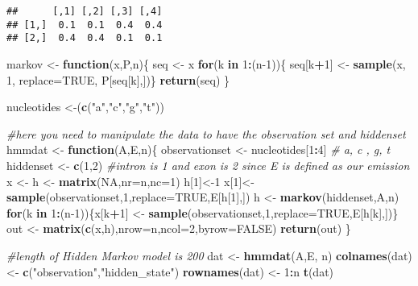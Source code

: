 \documentclass[
]{article}
\newenvironment{Shaded}{\begin{snugshade}}{\end{snugshade}}
\newcommand{\CommentTok}[1]{\textcolor[rgb]{0.56,0.35,0.01}{\textit{#1}}}
\newcommand{\ControlFlowTok}[1]{\textcolor[rgb]{0.13,0.29,0.53}{\textbf{#1}}}
\newcommand{\DataTypeTok}[1]{\textcolor[rgb]{0.13,0.29,0.53}{#1}}
\newcommand{\DecValTok}[1]{\textcolor[rgb]{0.00,0.00,0.81}{#1}}
\newcommand{\KeywordTok}[1]{\textcolor[rgb]{0.13,0.29,0.53}{\textbf{#1}}}
\newcommand{\NormalTok}[1]{#1}
\newcommand{\OperatorTok}[1]{\textcolor[rgb]{0.81,0.36,0.00}{\textbf{#1}}}
\newcommand{\OtherTok}[1]{\textcolor[rgb]{0.56,0.35,0.01}{#1}}
\newcommand{\StringTok}[1]{\textcolor[rgb]{0.31,0.60,0.02}{#1}}
\begin{document}
\begin{verbatim}
##      [,1] [,2] [,3] [,4]
## [1,]  0.1  0.1  0.4  0.4
## [2,]  0.4  0.4  0.1  0.1
\end{verbatim}

\begin{Shaded}
\begin{Highlighting}[]
\NormalTok{markov <-}\StringTok{ }\ControlFlowTok{function}\NormalTok{(x,P,n)\{ seq <-}\StringTok{ }\NormalTok{x}
\ControlFlowTok{for}\NormalTok{(k }\ControlFlowTok{in} \DecValTok{1}\OperatorTok{:}\NormalTok{(n}\DecValTok{-1}\NormalTok{))\{}
\NormalTok{ seq[k}\OperatorTok{+}\DecValTok{1}\NormalTok{] <-}\StringTok{ }\KeywordTok{sample}\NormalTok{(x, }\DecValTok{1}\NormalTok{, }\DataTypeTok{replace=}\OtherTok{TRUE}\NormalTok{, P[seq[k],])\}}
\KeywordTok{return}\NormalTok{(seq)}
\NormalTok{\}}

\NormalTok{nucleotides <-(}\KeywordTok{c}\NormalTok{(}\StringTok{"a"}\NormalTok{,}\StringTok{"c"}\NormalTok{,}\StringTok{"g"}\NormalTok{,}\StringTok{"t"}\NormalTok{))}

\CommentTok{#here you need to manipulate the data to have the observation set and hiddenset}
\NormalTok{hmmdat <-}\StringTok{ }\ControlFlowTok{function}\NormalTok{(A,E,n)\{}
\NormalTok{ observationset <-}\StringTok{ }\NormalTok{nucleotides[}\DecValTok{1}\OperatorTok{:}\DecValTok{4}\NormalTok{] }\CommentTok{# a, c , g, t}
\NormalTok{ hiddenset <-}\StringTok{ }\KeywordTok{c}\NormalTok{(}\DecValTok{1}\NormalTok{,}\DecValTok{2}\NormalTok{) }\CommentTok{#intron is 1 and exon is 2 since E is defined as our emission}
\NormalTok{ x <-}\StringTok{ }\NormalTok{h <-}\StringTok{ }\KeywordTok{matrix}\NormalTok{(}\OtherTok{NA}\NormalTok{,}\DataTypeTok{nr=}\NormalTok{n,}\DataTypeTok{nc=}\DecValTok{1}\NormalTok{)}
\NormalTok{ h[}\DecValTok{1}\NormalTok{]<-}\DecValTok{1}
\NormalTok{ x[}\DecValTok{1}\NormalTok{]<-}\KeywordTok{sample}\NormalTok{(observationset,}\DecValTok{1}\NormalTok{,}\DataTypeTok{replace=}\OtherTok{TRUE}\NormalTok{,E[h[}\DecValTok{1}\NormalTok{],])}
\NormalTok{ h <-}\StringTok{ }\KeywordTok{markov}\NormalTok{(hiddenset,A,n)}
 \ControlFlowTok{for}\NormalTok{(k }\ControlFlowTok{in} \DecValTok{1}\OperatorTok{:}\NormalTok{(n}\DecValTok{-1}\NormalTok{))\{x[k}\OperatorTok{+}\DecValTok{1}\NormalTok{] <-}\StringTok{ }\KeywordTok{sample}\NormalTok{(observationset,}\DecValTok{1}\NormalTok{,}\DataTypeTok{replace=}\OtherTok{TRUE}\NormalTok{,E[h[k],])\}}
\NormalTok{ out <-}\StringTok{ }\KeywordTok{matrix}\NormalTok{(}\KeywordTok{c}\NormalTok{(x,h),}\DataTypeTok{nrow=}\NormalTok{n,}\DataTypeTok{ncol=}\DecValTok{2}\NormalTok{,}\DataTypeTok{byrow=}\OtherTok{FALSE}\NormalTok{)}
 \KeywordTok{return}\NormalTok{(out)}
\NormalTok{\}}


\CommentTok{#length of Hidden Markov model is 200}
\NormalTok{dat <-}\StringTok{ }\KeywordTok{hmmdat}\NormalTok{(A,E, n)}
\KeywordTok{colnames}\NormalTok{(dat) <-}\StringTok{ }\KeywordTok{c}\NormalTok{(}\StringTok{"observation"}\NormalTok{,}\StringTok{"hidden_state"}\NormalTok{)}
\KeywordTok{rownames}\NormalTok{(dat) <-}\StringTok{ }\DecValTok{1}\OperatorTok{:}\NormalTok{n}
\KeywordTok{t}\NormalTok{(dat)}
\end{Highlighting}
\end{Shaded}
\end{document}
